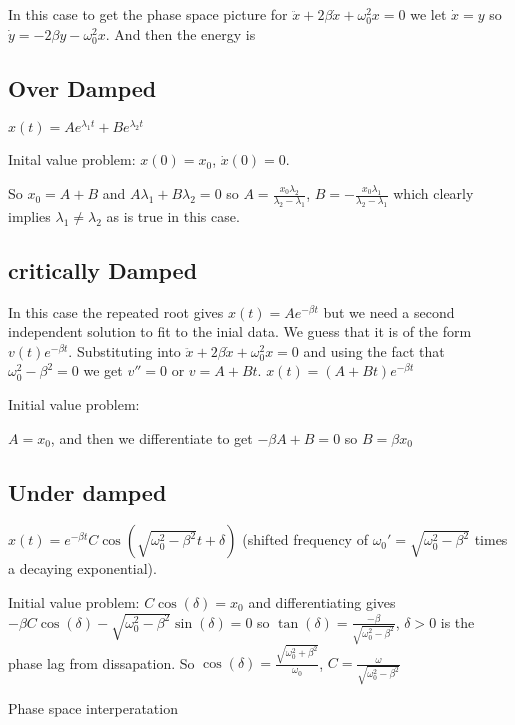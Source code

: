 \documentclass{homework}
\begin{document}
In this case to get the phase space picture for $\ddot x + 2\beta \dot x + \omega_0^2 x = 0$ we let $\dot x = y$ so $\dot y = -2\beta y - \omega_0^2x$. And then the energy is 

\subsection{Over Damped}

$x(t) = Ae^{\lambda_1 t} + Be^{\lambda_2 t}$

Inital value problem: $x(0) = x_0$, $\dot x(0) = 0$.

So $x_0 = A + B$ and $A \lambda_1 + B \lambda_2 = 0$ so $A = \frac{x_0 \lambda_2}{\lambda_2 - \lambda_1}$, $B = -\frac{x_0 \lambda_1}{\lambda_2 - \lambda_1}$ which clearly implies $\lambda_1 \neq \lambda_2$ as is true in this case.



\subsection{critically Damped}
In this case the repeated root gives $x(t) = Ae^{-\beta t}$ but we need a second independent solution to fit to the inial data. We guess that it is of the form $v(t)e^{-\beta t}$. Substituting into $\ddot x + 2\beta \dot x + \omega_0^2 x = 0$ and using the fact that $\omega_0^2 - \beta^2 = 0$ we get $v'' = 0$ or $v = A + Bt$. 
$x(t) = (A+Bt)e^{-\beta t}$


Initial value problem:

$A = x_0$, and then we differentiate to get $-\beta A + B = 0$ so $B = \beta x_0$

\subsection{Under damped}
$x(t) = e^{-\beta t}C \cos(\sqrt{\omega_0^2 - \beta^2}t + \delta)$ (shifted frequency of $\omega_0'  = \sqrt{\omega_0^2 - \beta^2}$ times a decaying exponential).


Initial value problem: $C\cos(\delta) = x_0$ and differentiating gives $-\beta C \cos (\delta) - \sqrt{\omega_0^2 - \beta^2}\sin (\delta) =0$ so $\tan(\delta) = \frac{-\beta}{\sqrt{\omega_0^2 - \beta^2}}$, $\delta >0$ is the phase lag from dissapation. So $\cos (\delta) = \frac{\sqrt{\omega_0^2 + \beta^2}}{\omega_0}$, $C = \frac{\omega}{\sqrt{\omega_0^2 - \beta^2}}$



Phase space interperatation
\end{document}
